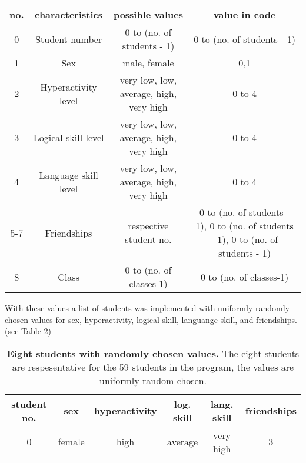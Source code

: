 \begin{onehalfspace}
\begin{table} [H]
    \label{Tab:values} 
    
    \begin{tabular}{c|c|c|c}
        no. & characteristics  & possible values & value in code \\ \hline \hline
        0 & Student number & 0 to (no. of students - 1) &  0 to (no. of students - 1) \\\hline 

        1 & Sex & male, female &  0,1\\ \hline

        2 & Hyperactivity level & very low, low, average, high, very high & 0 to 4   \\ \hline 
        
        3 & Logical skill level & very low, low, average, high, very high & 0 to 4    \\ \hline 
        
        4 & Language skill level& very low, low, average, high, very high & 0 to 4    \\\hline 
        
        5-7 & Friendships & respective student no. & 0 to (no. of students - 1), 0 to (no. of students - 1), 0 to (no. of students - 1)    \\\hline 
        8 & Class & 0 to (no. of classes-1)& 0 to  (no. of classes-1) \\\hline 
        
    \end{tabular}
\end{table}
With these values a list of students was implemented with uniformly randomly chosen values for sex, hyperactivity, logical skill, languange skill, and friendships. (see Table \ref{Tab:8students})

\begin{table} [H]
    \centering
    \caption[Eight students with randomly chosen values]{\textbf{Eight students with randomly chosen values.} The eight students are respesentative for the 59 students in the program, the values are uniformly random chosen.}

    \label{Tab:8students} 

    
    \begin{tabular}{c|c|c|c|c|c}
        student no. & sex & hyperactivity  & log. skill & lang. skill & friendships \\ \hline \hline
        

        0 & female &  high & average & very high & 3\\ \hline


\end{tabular}
\end{table}
\end{onehalfspace}
